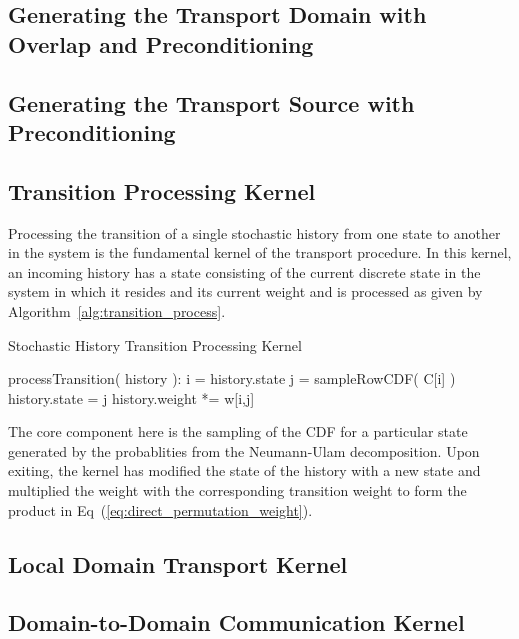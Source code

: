 \subsection{Generating the Transport Domain with Overlap and Preconditioning}
\label{subsec:domain_generation}

\subsection{Generating the Transport Source with Preconditioning}
\label{subsec:source_generation}

\subsection{Transition Processing Kernel}
\label{subsec:transition_processing}
Processing the transition of a single stochastic history from one
state to another in the system is the fundamental kernel of the
transport procedure. In this kernel, an incoming history has a state
consisting of the current discrete state in the system in which it
resides and its current weight and is processed as given by
Algorithm~\ref{alg:transition_process}.
\begin{algorithm}[h!]
  \caption{Stochastic History Transition Processing Kernel}
  \label{alg:power_iteration}
  \begin{algorithmic}
    \State processTransition( history ):
    \State i = history.state
    \State j = sampleRowCDF( C[i] )
    \State history.state = j
    \State history.weight *= w[i,j]
  \end{algorithmic}
\end{algorithm}
The core component here is the sampling of the CDF for a particular
state generated by the probablities from the Neumann-Ulam
decomposition. Upon exiting, the kernel has modified the state of the
history with a new state and multiplied the weight with the
corresponding transition weight to form the product in
Eq~(\ref{eq:direct_permutation_weight}).

\subsection{Local Domain Transport Kernel}
\label{subsec:local_domain_transport}

\subsection{Domain-to-Domain Communication Kernel}
\label{subsec:domain_to_domain_kernel}

